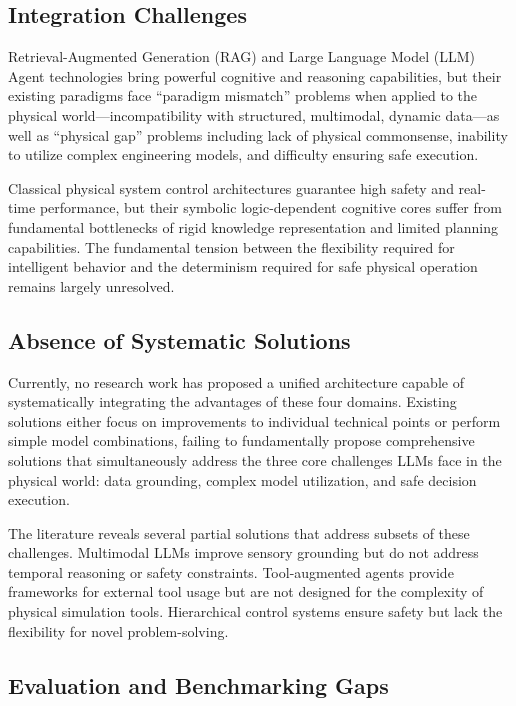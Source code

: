 \subsection{Integration Challenges}

Retrieval-Augmented Generation (RAG) and Large Language Model (LLM) Agent technologies bring powerful cognitive and reasoning capabilities, but their existing paradigms face ``paradigm mismatch'' problems when applied to the physical world—incompatibility with structured, multimodal, dynamic data—as well as ``physical gap'' problems including lack of physical commonsense, inability to utilize complex engineering models, and difficulty ensuring safe execution.

Classical physical system control architectures guarantee high safety and real-time performance, but their symbolic logic-dependent cognitive cores suffer from fundamental bottlenecks of rigid knowledge representation and limited planning capabilities. The fundamental tension between the flexibility required for intelligent behavior and the determinism required for safe physical operation remains largely unresolved.

\subsection{Absence of Systematic Solutions}

Currently, no research work has proposed a unified architecture capable of systematically integrating the advantages of these four domains. Existing solutions either focus on improvements to individual technical points or perform simple model combinations, failing to fundamentally propose comprehensive solutions that simultaneously address the three core challenges LLMs face in the physical world: data grounding, complex model utilization, and safe decision execution.

The literature reveals several partial solutions that address subsets of these challenges. Multimodal LLMs improve sensory grounding but do not address temporal reasoning or safety constraints. Tool-augmented agents provide frameworks for external tool usage but are not designed for the complexity of physical simulation tools. Hierarchical control systems ensure safety but lack the flexibility for novel problem-solving.

\subsection{Evaluation and Benchmarking Gaps}

